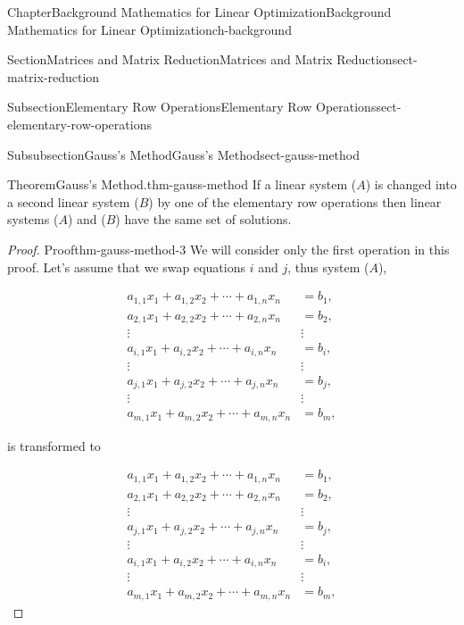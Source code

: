 \documentclass[oneside,10pt,]{book}
\numberwithin{equation}{section}
\newcommand{\amp}{&}
\begin{document}
\begin{chapterptx}{Chapter}{Background Mathematics for Linear Optimization}{}{Background Mathematics for Linear Optimization}{}{}{ch-background}
\begin{sectionptx}{Section}{Matrices and Matrix Reduction}{}{Matrices and Matrix Reduction}{}{}{sect-matrix-reduction}
\begin{subsectionptx}{Subsection}{Elementary Row Operations}{}{Elementary Row Operations}{}{}{sect-elementary-row-operations}
\begin{subsubsectionptx}{Subsubsection}{Gauss's Method}{}{Gauss's Method}{}{}{sect-gauss-method}
\begin{theorem}{Theorem}{Gauss's Method.}{}{thm-gauss-method}%
If a linear system (\(A\)) is changed into a second linear system (\(B\)) by one of the elementary row operations then linear systems (\(A\)) and (\(B\)) have the same set of solutions.%
\end{theorem}
\begin{proof}{Proof}{}{thm-gauss-method-3}
We will consider only the first operation in this proof. Let's assume that we swap equations \(i\) and \(j\), thus system (\(A\)),%
\par
%
\begin{align*}
a_{1,1} x_1 + a_{1,2} x_2 + \cdots + a_{1,n} x_n \amp = b_1 , \\
a_{2,1} x_1 + a_{2,2} x_2 + \cdots + a_{2,n} x_n \amp = b_2, \\
\vdots \qquad \qquad \amp \vdots \\
a_{i,1} x_1 + a_{i,2} x_2 + \cdots + a_{i,n} x_n \amp = b_i, \\
\vdots \qquad \qquad \amp \vdots \\
a_{j,1} x_1 + a_{j,2} x_2 + \cdots + a_{j,n} x_n \amp = b_j, \\
\vdots \qquad \qquad \amp \vdots \\
a_{m,1} x_1 + a_{m,2} x_2 + \cdots + a_{m,n} x_n \amp = b_m,
\end{align*}
%
\par
is transformed to%
\par
%
\begin{align*}
a_{1,1} x_1 + a_{1,2} x_2 + \cdots + a_{1,n} x_n \amp = b_1 , \\
a_{2,1} x_1 + a_{2,2} x_2 + \cdots + a_{2,n} x_n \amp = b_2, \\
\vdots \qquad \qquad \amp \vdots \\
a_{j,1} x_1 + a_{j,2} x_2 + \cdots + a_{j,n} x_n \amp = b_j, \\
\vdots \qquad \qquad \amp \vdots \\
a_{i,1} x_1 + a_{i,2} x_2 + \cdots + a_{i,n} x_n \amp = b_i, \\
\vdots \qquad \qquad \amp \vdots \\
a_{m,1} x_1 + a_{m,2} x_2 + \cdots + a_{m,n} x_n \amp = b_m,
\end{align*}
%
\par

\end{proof}
\end{subsubsectionptx}
\end{subsectionptx}
\end{sectionptx}
\end{chapterptx}
\end{document}
